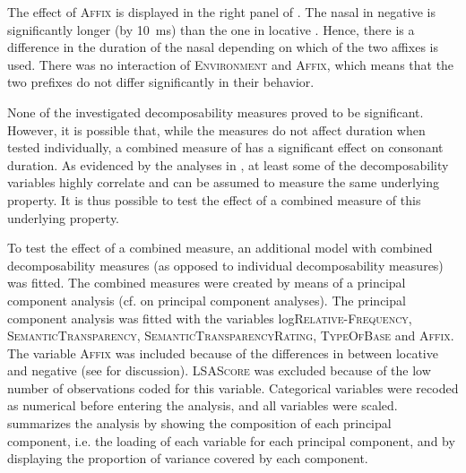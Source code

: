 The effect of \textsc{Affix} is displayed  in the right panel of . The nasal in negative  is significantly longer (by 10~ms) than the one in locative . Hence, there is a difference in the duration of the nasal depending on which of the two affixes is used. There was no interaction of \textsc{Environment} and \textsc{Affix}, which means that the two prefixes do not differ significantly in their  behavior.


None of the investigated decomposability measures proved to be significant. However, it is possible that, while the measures do not affect duration when tested individually, a combined measure of  has a significant effect on consonant duration. As evidenced by the  analyses in , at least some of the decomposability variables highly correlate and can be assumed to measure the same underlying property. It is thus possible to test the effect of a combined measure of this underlying property. 

To test the effect of a combined  measure, an additional model with combined decomposability measures (as opposed to individual decomposability measures) was fitted. The combined measures were created by means of a principal component analysis (cf.  on principal component analyses). 
The principal component analysis was fitted with the variables log\textsc{Relative-Frequency}, \textsc{SemanticTransparency}, \textsc{SemanticTransparencyRating}, \textsc{TypeOfBase} and \textsc{Affix}. The variable \textsc{Affix} was included because of the differences in  between locative and negative  (see  for discussion). \textsc{LSAScore} was excluded because of the low number of observations coded for this variable. Categorical variables were recoded as numerical before entering the analysis, and all variables were scaled.
 summarizes the analysis by showing the composition of each principal component, i.e. the loading of each variable for each principal component, and by displaying the proportion of variance covered by each component. 


